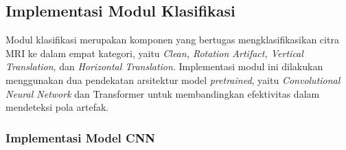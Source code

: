 \subsection{Implementasi Modul Klasifikasi}

Modul klasifikasi merupakan komponen yang bertugas mengklasifikasikan citra MRI ke dalam empat kategori, yaitu \textit{Clean, Rotation Artifact, Vertical Translation}, dan \textit{Horizontal Translation}. Implementasi modul ini dilakukan menggunakan dua pendekatan arsitektur model \textit{pretrained}, yaitu \textit{Convolutional Neural Network} dan Transformer untuk membandingkan efektivitas dalam mendeteksi pola artefak.

\subsubsection{Implementasi Model CNN}

